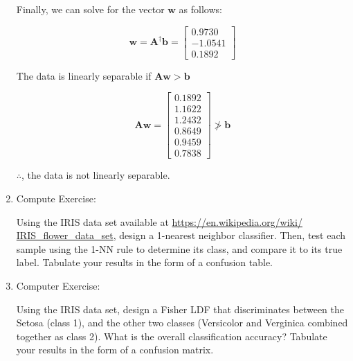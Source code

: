 \documentclass[fleqn]{article}
\begin{document}
\begin{enumerate}
		Finally, we can solve for the vector $\mathbf{w}$ as follows:
		
		\begin{equation*}
			\mathbf{w} = \mathbf{A}^{\dag}\mathbf{b} = \begin{bmatrix} 0.9730 \\ -1.0541 \\ 0.1892 \end{bmatrix}
		\end{equation*}
		
		The data is linearly separable if $\mathbf{A}\mathbf{w} > \mathbf{b}$
		
		\begin{equation*}
			\mathbf{A}\mathbf{w} = \begin{bmatrix}
				0.1892 \\
    				1.1622 \\
   	 			1.2432 \\
    				0.8649 \\
    				0.9459 \\
    				0.7838
			\end{bmatrix} \ngtr \mathbf{b}
		\end{equation*}
		
		$\therefore$, the data is not linearly separable.
		
		\item Compute Exercise:
		
		Using the IRIS data set available at \href{https://en.wikipedia.org/wiki/IRIS_flower_data_set}{https://en.wikipedia.org/wiki/\\IRIS\_flower\_data\_set}, design a 1-nearest neighbor classifier. Then, test each sample using the 1-NN rule to determine its class, and compare it to its true label. Tabulate your results in the form of a confusion table.
		
		\item Computer Exercise:
		
		Using the IRIS data set, design a Fisher LDF that discriminates between the Setosa (class 1), and the other two classes (Versicolor and Verginica combined together as class 2). What is the overall classification accuracy? Tabulate your results in the form of a confusion matrix.
		
	\end{enumerate}
\end{document}
